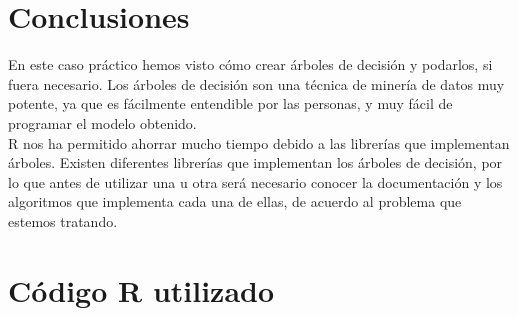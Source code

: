 \documentclass[12pt,a4paper,twoside,openright,titlepage,final]{article}
\begin{document}
\section{Conclusiones}

En este caso práctico hemos visto cómo crear árboles de decisión y podarlos, si fuera necesario. Los árboles de decisión son una técnica de minería de datos muy potente, ya que es fácilmente entendible por las personas, y muy fácil de programar el modelo obtenido.\\

R nos ha permitido ahorrar mucho tiempo debido a las librerías que implementan árboles. Existen diferentes librerías que implementan los árboles de decisión, por lo que antes de utilizar una u otra será necesario conocer la documentación y los algoritmos que implementa cada una de ellas, de acuerdo al problema que estemos tratando. 

\clearpage

\section{Código R utilizado}


\end{document}
